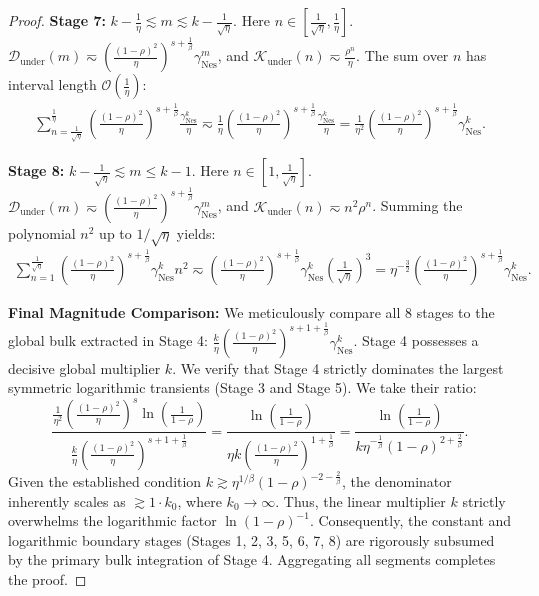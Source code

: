 \begin{proof}
\textbf{Stage 7:} $k - \frac{1}{\eta} \lesssim m \lesssim k - \frac{1}{\sqrt{\eta}}$. 
Here $n \in \left[\frac{1}{\sqrt{\eta}}, \frac{1}{\eta}\right]$. $\mathcal{D}_{\mathrm{under}}(m) \eqsim \left(\frac{(1-\rho)^2}{\eta}\right)^{s+\frac{1}{\beta}} \gamma_{\mathrm{Nes}}^m$, and $\mathcal{K}_{\mathrm{under}}(n) \eqsim \frac{\rho^n}{\eta}$. 
The sum over $n$ has interval length $\mathcal{O}(\frac{1}{\eta})$:
\begin{align*}
    \sum_{n=\frac{1}{\sqrt{\eta}}}^{\frac{1}{\eta}} \left(\frac{(1-\rho)^2}{\eta}\right)^{s+\frac{1}{\beta}} \frac{\gamma_{\mathrm{Nes}}^k}{\eta} \eqsim \frac{1}{\eta} \left(\frac{(1-\rho)^2}{\eta}\right)^{s+\frac{1}{\beta}} \frac{\gamma_{\mathrm{Nes}}^k}{\eta} = \frac{1}{\eta^2} \left(\frac{(1-\rho)^2}{\eta}\right)^{s+\frac{1}{\beta}} \gamma_{\mathrm{Nes}}^k.
\end{align*}

\textbf{Stage 8:} $k - \frac{1}{\sqrt{\eta}} \lesssim m \le k-1$. 
Here $n \in \left[1, \frac{1}{\sqrt{\eta}}\right]$. $\mathcal{D}_{\mathrm{under}}(m) \eqsim \left(\frac{(1-\rho)^2}{\eta}\right)^{s+\frac{1}{\beta}} \gamma_{\mathrm{Nes}}^m$, and $\mathcal{K}_{\mathrm{under}}(n) \eqsim n^2 \rho^n$. 
Summing the polynomial $n^2$ up to $1/\sqrt{\eta}$ yields:
\begin{align*}
    \sum_{n=1}^{\frac{1}{\sqrt{\eta}}} \left(\frac{(1-\rho)^2}{\eta}\right)^{s+\frac{1}{\beta}} \gamma_{\mathrm{Nes}}^k n^2 \eqsim \left(\frac{(1-\rho)^2}{\eta}\right)^{s+\frac{1}{\beta}} \gamma_{\mathrm{Nes}}^k \left(\frac{1}{\sqrt{\eta}}\right)^3 = \eta^{-\frac{3}{2}} \left(\frac{(1-\rho)^2}{\eta}\right)^{s+\frac{1}{\beta}} \gamma_{\mathrm{Nes}}^k.
\end{align*}

\textbf{Final Magnitude Comparison:}
We meticulously compare all 8 stages to the global bulk extracted in Stage 4: $\frac{k}{\eta} \left(\frac{(1-\rho)^2}{\eta}\right)^{s+1+\frac{1}{\beta}} \gamma_{\mathrm{Nes}}^k$.
Stage 4 possesses a decisive global multiplier $k$. We verify that Stage 4 strictly dominates the largest symmetric logarithmic transients (Stage 3 and Stage 5). We take their ratio:
\begin{equation*}
    \frac{\frac{1}{\eta^2} \left(\frac{(1-\rho)^2}{\eta}\right)^s \ln\left(\frac{1}{1-\rho}\right)}{\frac{k}{\eta} \left(\frac{(1-\rho)^2}{\eta}\right)^{s+1+\frac{1}{\beta}}} = \frac{\ln\left(\frac{1}{1-\rho}\right)}{\eta k \left(\frac{(1-\rho)^2}{\eta}\right)^{1+\frac{1}{\beta}}} = \frac{\ln\left(\frac{1}{1-\rho}\right)}{k \eta^{-\frac{1}{\beta}} (1-\rho)^{2+\frac{2}{\beta}}}.
\end{equation*}
Given the established condition $k \gtrsim \eta^{1/\beta}(1-\rho)^{-2-\frac{2}{\beta}}$, the denominator inherently scales as $\gtrsim 1 \cdot k_0$, where $k_0 \to \infty$. Thus, the linear multiplier $k$ strictly overwhelms the logarithmic factor $\ln(1-\rho)^{-1}$.
Consequently, the constant and logarithmic boundary stages (Stages 1, 2, 3, 5, 6, 7, 8) are rigorously subsumed by the primary bulk integration of Stage 4. Aggregating all segments completes the proof.
\end{proof}

